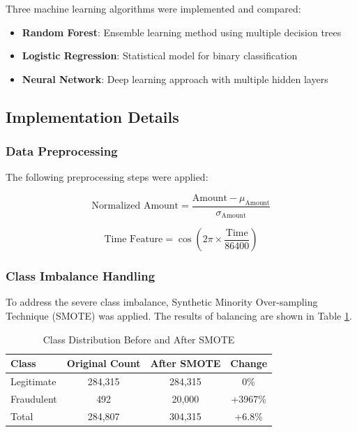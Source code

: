 Three machine learning algorithms were implemented and compared:

\begin{itemize}
\item \textbf{Random Forest}: Ensemble learning method using multiple decision trees
\item \textbf{Logistic Regression}: Statistical model for binary classification
\item \textbf{Neural Network}: Deep learning approach with multiple hidden layers
\end{itemize}

\subsection{Implementation Details}

\subsubsection{Data Preprocessing}

The following preprocessing steps were applied:

\begin{equation}
\text{Normalized Amount} = \frac{\text{Amount} - \mu_{\text{Amount}}}{\sigma_{\text{Amount}}}
\end{equation}

\begin{equation}
\text{Time Feature} = \cos\left(2\pi \times \frac{\text{Time}}{86400}\right)
\end{equation}

\subsubsection{Class Imbalance Handling}

To address the severe class imbalance, Synthetic Minority Over-sampling Technique (SMOTE) was applied. The results of balancing are shown in Table \ref{tab:balance_results}.

\begin{table}[h!]
\centering
\caption{Class Distribution Before and After SMOTE}
\label{tab:balance_results}
\begin{tabular}{lccc}
\toprule
\textbf{Class} & \textbf{Original Count} & \textbf{After SMOTE} & \textbf{Change} \\
\midrule
Legitimate & 284,315 & 284,315 & 0\% \\
Fraudulent & 492 & 20,000 & +3967\% \\
Total & 284,807 & 304,315 & +6.8\% \\
\bottomrule
\end{tabular}
\end{table}

